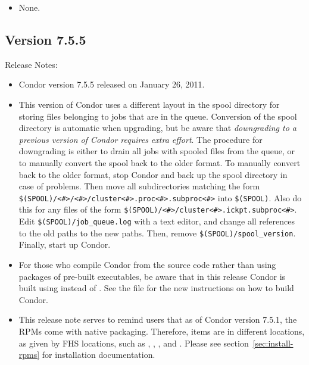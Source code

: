 \begin{itemize}

\item None.

\end{itemize}


\subsection*{\label{sec:New-7-5-5}Version 7.5.5}

\noindent Release Notes:

\begin{itemize}

\item Condor version 7.5.5 released on January 26, 2011.

\item This version of Condor uses a different layout in the spool
  directory for storing files belonging to jobs that are in the queue.
  Conversion of the spool directory is automatic when upgrading, but
  be aware that \emph{downgrading to a previous version of Condor
  requires extra effort}.  The procedure for downgrading is either
  to drain all jobs with spooled files from the queue, or to manually
  convert the spool back to the older format.  To manually convert
  back to the older format, stop Condor and back up the spool directory
  in case of problems.  Then move all subdirectories matching the form
  \verb|$(SPOOL)/<#>/<#>/cluster<#>.proc<#>.subproc<#>| into
  \verb|$(SPOOL)|.  Also do this for any files of the form
  \verb|$(SPOOL)/<#>/cluster<#>.ickpt.subproc<#>|.  Edit
  \verb|$(SPOOL)/job_queue.log| with a text editor, and change all
  references to the old paths to the new paths.  Then, remove
  \verb|$(SPOOL)/spool_version|.  Finally, start up Condor.

\item For those who compile Condor from the source code rather than
  using packages of pre-built executables, be aware that in this
  release Condor is built using  instead of .
  See the  file for the new instructions on how
  to build Condor.

\item This release note serves to remind users that as of Condor version 7.5.1,
  the RPMs come with native packaging.  
  Therefore, items are in different locations, as given by FHS locations,
  such as , , , and .  
  Please see section~\ref{sec:install-rpms} for installation documentation.


\end{itemize}
